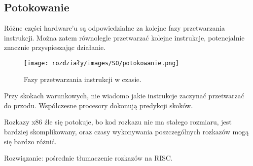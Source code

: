 \subsection{Potokowanie}
Różne części hardware'u są odpowiedzialne za kolejne fazy przetwarzania instrukcji. Można zatem równolegle przetwarzać kolejne instrukcje, potencjalnie znacznie przyspieszając działanie.

\begin{figure}[H]
    \centering
    \texttt{[image: rozdziały/images/SO/potokowanie.png]}
    \caption{Fazy przetwarzania instrukcji w czasie.}
\end{figure}

Przy skokach warunkowych, nie wiadomo jakie instrukcje zaczynać przetwarzać do przodu. Współczesne procesory dokonują predykcji skoków.

Rozkazy x86 źle się potokuje, bo kod rozkazu nie ma stałego rozmiaru, jest bardziej skomplikowany, oraz czasy wykonywania poszczególnych rozkazów mogą się bardzo różnić. 

Rozwiązanie: pośrednie tłumaczenie rozkazów na RISC.

